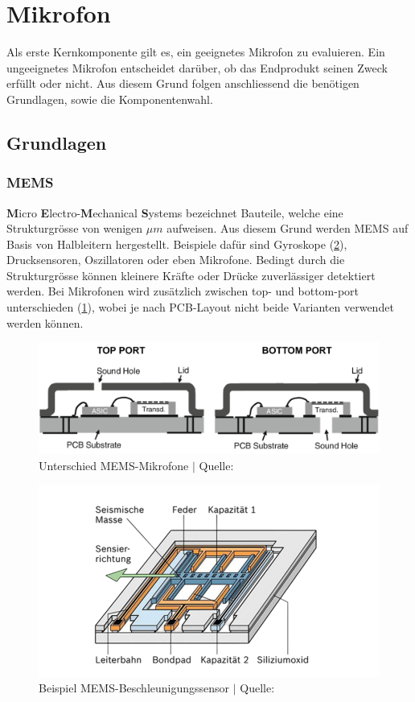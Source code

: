 \documentclass[12pt]{article}
\begin{document}
	\newpage
	\section{Mikrofon}\label{Mikrofon}
	Als erste Kernkomponente gilt es, ein geeignetes Mikrofon zu evaluieren. Ein ungeeignetes Mikrofon entscheidet darüber, ob das Endprodukt seinen Zweck erfüllt oder nicht. Aus diesem Grund folgen anschliessend die benötigen Grundlagen, sowie die Komponentenwahl.
	\subsection{Grundlagen}
	\subsubsection*{MEMS}
	\textbf{M}icro \textbf{E}lectro-\textbf{M}echanical \textbf{S}ystems bezeichnet Bauteile, welche eine Strukturgrösse von wenigen $\mu m$ aufweisen. Aus diesem Grund werden MEMS auf Basis von Halbleitern hergestellt. Beispiele dafür sind Gyroskope (\ref{fig:batbeispielbeschleunigungssensor}), Drucksensoren, Oszillatoren oder eben Mikrofone. Bedingt durch die Strukturgrösse können kleinere Kräfte oder Drücke zuverlässiger detektiert werden. Bei Mikrofonen wird zusätzlich zwischen top- und bottom-port unterschieden (\ref{fig:batmems-mikrofon}), wobei je nach PCB-Layout nicht beide Varianten verwendet werden können. 
	\begin{figure}[H]
		\centering
		\includegraphics[width=0.6\linewidth]{images/BAT_MEMS-Mikrofon}
		\caption{Unterschied MEMS-Mikrofone $\vert$ Quelle: \cite{feiertag_flip_2010}}
		\label{fig:batmems-mikrofon}
	\end{figure}
	\begin{figure}[H]
		\centering
		\includegraphics[width=0.55\linewidth]{images/BAT_Beispiel_Beschleunigungssensor_transparent}
		\caption{Beispiel MEMS-Beschleunigungssensor $\vert$ Quelle: \cite{noauthor_peripherer_nodate}}
		\label{fig:batbeispielbeschleunigungssensor}
	\end{figure}
	
\end{document}
